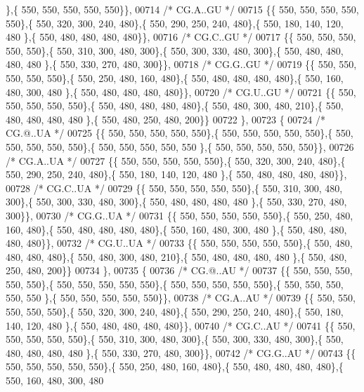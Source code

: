 \begin{DoxyCode}
      \},\{ 550, 550, 550, 550, 550\}\},
00714 \textcolor{comment}{/* CG.A..GU */}
00715 \{\{ 550, 550, 550, 550, 550\},\{ 550, 320, 300, 240, 480\},\{ 550, 290, 250, 240, 480\},\{ 550, 180, 140, 120, 480
      \},\{ 550, 480, 480, 480, 480\}\},
00716 \textcolor{comment}{/* CG.C..GU */}
00717 \{\{ 550, 550, 550, 550, 550\},\{ 550, 310, 300, 480, 300\},\{ 550, 300, 330, 480, 300\},\{ 550, 480, 480, 480, 480
      \},\{ 550, 330, 270, 480, 300\}\},
00718 \textcolor{comment}{/* CG.G..GU */}
00719 \{\{ 550, 550, 550, 550, 550\},\{ 550, 250, 480, 160, 480\},\{ 550, 480, 480, 480, 480\},\{ 550, 160, 480, 300, 480
      \},\{ 550, 480, 480, 480, 480\}\},
00720 \textcolor{comment}{/* CG.U..GU */}
00721 \{\{ 550, 550, 550, 550, 550\},\{ 550, 480, 480, 480, 480\},\{ 550, 480, 300, 480, 210\},\{ 550, 480, 480, 480, 480
      \},\{ 550, 480, 250, 480, 200\}\}
00722 \},
00723 \{
00724 \textcolor{comment}{/* CG.@..UA */}
00725 \{\{ 550, 550, 550, 550, 550\},\{ 550, 550, 550, 550, 550\},\{ 550, 550, 550, 550, 550\},\{ 550, 550, 550, 550, 550
      \},\{ 550, 550, 550, 550, 550\}\},
00726 \textcolor{comment}{/* CG.A..UA */}
00727 \{\{ 550, 550, 550, 550, 550\},\{ 550, 320, 300, 240, 480\},\{ 550, 290, 250, 240, 480\},\{ 550, 180, 140, 120, 480
      \},\{ 550, 480, 480, 480, 480\}\},
00728 \textcolor{comment}{/* CG.C..UA */}
00729 \{\{ 550, 550, 550, 550, 550\},\{ 550, 310, 300, 480, 300\},\{ 550, 300, 330, 480, 300\},\{ 550, 480, 480, 480, 480
      \},\{ 550, 330, 270, 480, 300\}\},
00730 \textcolor{comment}{/* CG.G..UA */}
00731 \{\{ 550, 550, 550, 550, 550\},\{ 550, 250, 480, 160, 480\},\{ 550, 480, 480, 480, 480\},\{ 550, 160, 480, 300, 480
      \},\{ 550, 480, 480, 480, 480\}\},
00732 \textcolor{comment}{/* CG.U..UA */}
00733 \{\{ 550, 550, 550, 550, 550\},\{ 550, 480, 480, 480, 480\},\{ 550, 480, 300, 480, 210\},\{ 550, 480, 480, 480, 480
      \},\{ 550, 480, 250, 480, 200\}\}
00734 \},
00735 \{
00736 \textcolor{comment}{/* CG.@..AU */}
00737 \{\{ 550, 550, 550, 550, 550\},\{ 550, 550, 550, 550, 550\},\{ 550, 550, 550, 550, 550\},\{ 550, 550, 550, 550, 550
      \},\{ 550, 550, 550, 550, 550\}\},
00738 \textcolor{comment}{/* CG.A..AU */}
00739 \{\{ 550, 550, 550, 550, 550\},\{ 550, 320, 300, 240, 480\},\{ 550, 290, 250, 240, 480\},\{ 550, 180, 140, 120, 480
      \},\{ 550, 480, 480, 480, 480\}\},
00740 \textcolor{comment}{/* CG.C..AU */}
00741 \{\{ 550, 550, 550, 550, 550\},\{ 550, 310, 300, 480, 300\},\{ 550, 300, 330, 480, 300\},\{ 550, 480, 480, 480, 480
      \},\{ 550, 330, 270, 480, 300\}\},
00742 \textcolor{comment}{/* CG.G..AU */}
00743 \{\{ 550, 550, 550, 550, 550\},\{ 550, 250, 480, 160, 480\},\{ 550, 480, 480, 480, 480\},\{ 550, 160, 480, 300, 480

\end{DoxyCode}
